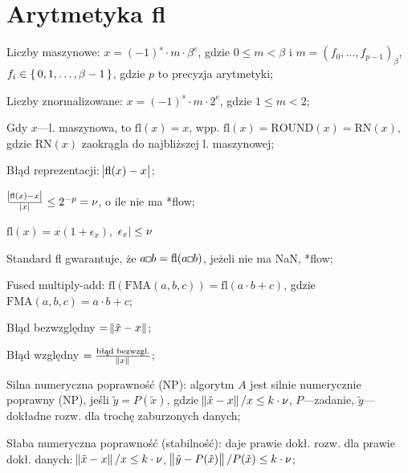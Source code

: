 \section{Arytmetyka fl}

\entry
Liczby maszynowe: $x=(-1)^s \cdot m \cdot \beta^e$, gdzie $0\leq m < \beta$ i $m=(f_0, \ldots, f_{p-1})_\beta$, $f_i\in\set{0,1,\ldots,\beta-1}$, gdzie $p$ to precyzja arytmetyki;

\entry
Liczby znormalizowane: $x=(-1)^s\cdot m \cdot 2^e$, gdzie $1\leq m < 2$;

\entry
Gdy $x$---l. maszynowa, to $\mathrm{fl}(x)=x$, wpp. $\mathrm{fl}(x)=\mathrm{ROUND}(x)=\mathrm{RN}(x)$, gdzie $\mathrm{RN}(x)$ zaokrągla do najbliższej l. maszynowej;

\entry
Błąd reprezentacji: $\abs{\mathrm{fl}(x) - x}$;

\entry
$\frac{\abs{\mathrm{fl}(x) - x}}{\abs{x}}\leq 2^{-p}=\nu$, o ile nie ma *flow;

\entry
$\mathrm{fl}(x) = x(1+\epsilon_x)$, $\abs{\epsilon_x}\leq \nu$

\entry
Standard fl gwarantuje, że $a \Hsquare b = \mathrm{fl}(a\Hsquare b)$, jeżeli nie ma NaN, *flow;

\entry
Fused multiply-add: $\mathrm{fl}(\mathrm{FMA}(a,b,c)) = \mathrm{fl}(a \cdot b + c)$, gdzie $\mathrm{FMA}(a,b,c)=a\cdot b + c$;


\entry
Błąd bezwzględny $=\norm{\tilde{x} - x}$;

\entry
Błąd względny $=\frac{\text{błąd bezwzgl.}}{\norm{x}}$;

\entry
Silna numeryczna poprawność (NP): algorytm $A$ jest silnie numerycznie poprawny (NP), jeśli $\tilde{y} = P(\tilde{x})$, gdzie $\norm{\tilde{x}-x} / x\leq k\cdot\nu$, $P$---zadanie, $\tilde{y}$---dokładne rozw. dla trochę zaburzonych danych;

\entry
Słaba numeryczna poprawność (stabilność): daje prawie dokł. rozw. dla prawie dokł. danych: $\norm{\tilde{x}-x} / x\leq k\cdot\nu$, $\norm{\tilde{y}-P(\tilde{x})} / P(\tilde{x})\leq k\cdot\nu$;
